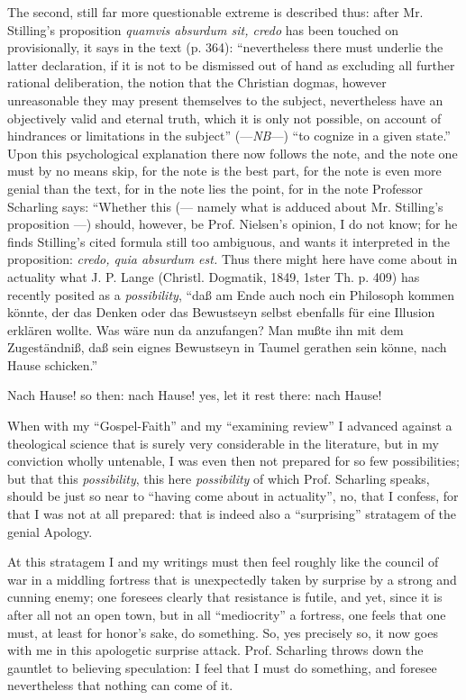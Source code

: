 \documentclass[12pt,a4paper,openany]{book}
\newcommand{\opage}[1]{\marginnote{\footnotesize\textit{[#1]}}}
\begin{document}
The second, still far more questionable extreme
is described thus: after Mr. Stilling's proposition
\textit{quamvis absurdum sit, credo} has been touched on provisionally, it says
in the text (p. 364): ``nevertheless there must
underlie the latter declaration, if it is not to be dismissed
out of hand as excluding all further rational
deliberation, the notion that the Christian dogmas,
however unreasonable they may present themselves to the subject,
nevertheless have an objectively valid and eternal
\setcounter{footnote}{0}%
\opage{7}truth, which it is only not possible, on account of hindrances
or limitations in the subject'' (---\textit{NB}---)
``to cognize in a given state.'' Upon this psychological
explanation there now follows the note, and the note one must
by no means skip, for the note is the best part, for
the note is even more genial than the text, for in
the note lies the point, for in the note Professor
Scharling says: ``Whether this (--- namely what is adduced
about Mr. Stilling's proposition ---) should, however,
be Prof. Nielsen's opinion, I do not know; for he finds
Stilling's cited formula still too ambiguous, and wants
it interpreted in the proposition: \textit{credo, quia absurdum est.}
Thus there might here have come about in actuality what
J. P. Lange (Christl. Dogmatik, 1849, 1ster Th. p.
409) has recently posited as a \emph{possibility}, ``daß am
Ende auch noch ein Philosoph kommen könnte, der das
Denken oder das Bewustseyn selbst ebenfalls für eine Illusion
erklären wollte. Was wäre nun da anzufangen?
Man mußte ihn mit dem Zugeständniß, daß sein eignes
Bewustseyn in Taumel gerathen sein könne, nach Hause
schicken.''

Nach Hause! so then: nach Hause! yes, let it rest
there: nach Hause!

When with my ``Gospel-Faith'' and my ``examining
review'' I advanced against a theological science that is surely
very considerable in the literature, but in my conviction
wholly untenable, I was even then not
prepared for so few possibilities; but that this \emph{possibility},
this here \emph{possibility} of which Prof. Scharling
speaks, should be just so near to ``having come about
in actuality'', no, that I confess, for that I was
\setcounter{footnote}{0}%
\opage{8}not at all prepared: that is indeed also a ``surprising'' stratagem
of the genial Apology.

At this stratagem I and my writings must then
feel roughly like the council of war in a middling
fortress that is unexpectedly taken by surprise by a strong
and cunning enemy; one foresees clearly that resistance is
futile, and yet, since it is after all not an open
town, but in all ``mediocrity'' a fortress, one feels that
one must, at least for honor's sake, do something. So,
yes precisely so, it now goes with me in this
apologetic surprise attack. Prof. Scharling throws down the gauntlet
to believing speculation: I feel that I must
do something, and foresee nevertheless that nothing can come
of it.
\end{document}
